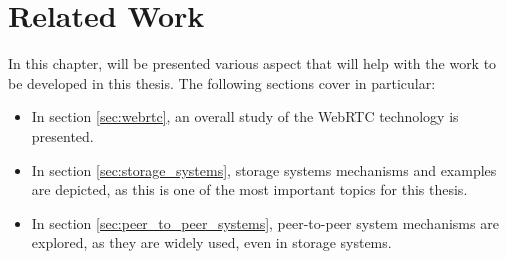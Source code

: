 \chapter{Related Work}
\label{cha:related_work}

In this chapter, will be presented various aspect that will help with the work to be developed in this thesis. The following sections cover in particular:
\begin{itemize}
\item In section \ref{sec:webrtc}, an overall study of the WebRTC technology is presented.

\item In section \ref{sec:storage_systems}, storage systems mechanisms and examples are depicted, as this is one of the most important topics for this thesis.

\item In section \ref{sec:peer_to_peer_systems}, peer-to-peer system mechanisms are explored, as they are widely used, even in storage systems.
\end{itemize}
	
